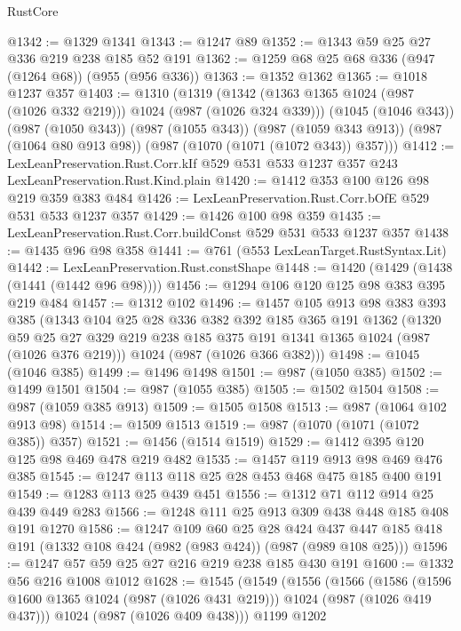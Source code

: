 \begin{lexlean}{RustCore}
\begin{coremodule}
@1342 := @1329 @1341
@1343 := @1247 @89
@1352 := @1343 @59 @25 @27 @336 @219 @238 @185 @52 @191
@1362 := @1259 @68 @25 @68 @336 (@947 (@1264 @68)) (@955 (@956 @336))
@1363 := @1352 @1362
@1365 := @1018 @1237 @357
@1403 := @1310
    (@1319
      (@1342 (@1363 @1365 @1024 (@987 (@1026 @332 @219))) @1024 (@987 (@1026 @324 @339)))
      (@1045 (@1046 @343))
      (@987 (@1050 @343))
      (@987 (@1055 @343))
      (@987 (@1059 @343 @913))
      (@987 (@1064 @80 @913 @98))
      (@987 (@1070 (@1071 (@1072 @343)) @357)))
@1412 := LexLeanPreservation.Rust.Corr.kIf
    @529
    @531
    @533
    @1237
    @357
    @243
    LexLeanPreservation.Rust.Kind.plain
@1420 := @1412 @353 @100 @126 @98 @219 @359 @383 @484
@1426 := LexLeanPreservation.Rust.Corr.bOfE @529 @531 @533 @1237 @357
@1429 := @1426 @100 @98 @359
@1435 := LexLeanPreservation.Rust.Corr.buildConst @529 @531 @533 @1237 @357
@1438 := @1435 @96 @98 @358
@1441 := @761 (@553 LexLeanTarget.RustSyntax.Lit)
@1442 := LexLeanPreservation.Rust.constShape
@1448 := @1420 (@1429 (@1438 (@1441 (@1442 @96 @98))))
@1456 := @1294 @106 @120 @125 @98 @383 @395 @219 @484
@1457 := @1312 @102
@1496 := @1457
    @105
    @913
    @98
    @383
    @393
    @385
    (@1343
      @104
      @25
      @28
      @336
      @382
      @392
      @185
      @365
      @191
      @1362
      (@1320 @59 @25 @27 @329 @219 @238 @185 @375 @191 @1341 @1365 @1024 (@987 (@1026 @376 @219)))
      @1024
      (@987 (@1026 @366 @382)))
@1498 := @1045 (@1046 @385)
@1499 := @1496 @1498
@1501 := @987 (@1050 @385)
@1502 := @1499 @1501
@1504 := @987 (@1055 @385)
@1505 := @1502 @1504
@1508 := @987 (@1059 @385 @913)
@1509 := @1505 @1508
@1513 := @987 (@1064 @102 @913 @98)
@1514 := @1509 @1513
@1519 := @987 (@1070 (@1071 (@1072 @385)) @357)
@1521 := @1456 (@1514 @1519)
@1529 := @1412 @395 @120 @125 @98 @469 @478 @219 @482
@1535 := @1457 @119 @913 @98 @469 @476 @385
@1545 := @1247 @113 @118 @25 @28 @453 @468 @475 @185 @400 @191
@1549 := @1283 @113 @25 @439 @451
@1556 := @1312 @71 @112 @914 @25 @439 @449 @283
@1566 := @1248 @111 @25 @913 @309 @438 @448 @185 @408 @191 @1270
@1586 := @1247
    @109
    @60
    @25
    @28
    @424
    @437
    @447
    @185
    @418
    @191
    (@1332 @108 @424 (@982 (@983 @424)) (@987 (@989 @108 @25)))
@1596 := @1247 @57 @59 @25 @27 @216 @219 @238 @185 @430 @191
@1600 := @1332 @56 @216 @1008 @1012
@1628 := @1545
    (@1549
      (@1556
        (@1566
          (@1586 (@1596 @1600 @1365 @1024 (@987 (@1026 @431 @219))) @1024 (@987 (@1026 @419 @437)))
          @1024
          (@987 (@1026 @409 @438)))
        @1199
        @1202

\end{coremodule}
\end{lexlean}

